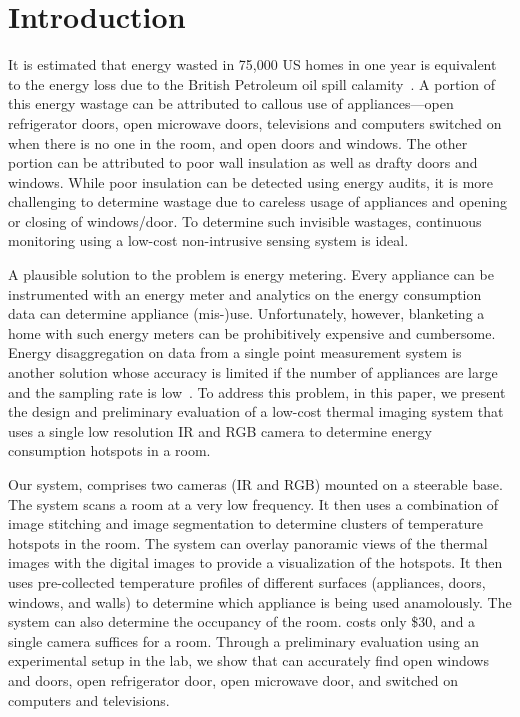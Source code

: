 \section{Introduction}
\label{sec:intro}

It is estimated that energy wasted in 75,000 US homes in one year is equivalent to the energy loss due to the British Petroleum oil
spill calamity~\cite{XX}. A portion of this energy wastage can be attributed to callous use of appliances---open refrigerator doors,
open microwave doors, televisions and computers switched on when there is no one in the room, and open doors and windows. The other
portion can be attributed to poor wall insulation as well as drafty doors and windows. While poor insulation can be detected using
energy audits, it is more challenging to determine wastage due to careless usage of appliances and opening or closing of windows/door.
To determine such invisible wastages, continuous monitoring using a low-cost non-intrusive sensing system is ideal.

A plausible solution to the problem is energy metering. Every appliance can be instrumented with an energy meter and analytics on the
energy consumption data can determine appliance (mis-)use. Unfortunately, however, blanketing a home with such energy meters can be
prohibitively expensive and cumbersome. Energy disaggregation on data from a single point measurement system is another solution 
whose accuracy is limited if the number of appliances are large and the sampling rate is low~\cite{XX}. To address this problem, in
this paper, we present the design and preliminary evaluation of a low-cost thermal imaging system that uses a single low resolution IR
and RGB camera to determine energy consumption hotspots in a room.

Our system, {\IRLeak} comprises two cameras (IR and RGB) mounted on a steerable base. The system scans a room at a very low frequency.
It then uses a combination of image stitching and image segmentation to determine clusters of temperature hotspots in the room. The
system can overlay panoramic views of the thermal images with the digital images to provide a visualization of the hotspots. It then
uses pre-collected temperature profiles of different surfaces (appliances, doors, windows, and walls) to determine which appliance is
being used anamolously. The system can also determine the occupancy of the room. {\IRLeak} costs only \$30, and a single camera
suffices for a room. Through a preliminary evaluation using an experimental setup in the lab, we show that {\IRLeak} can accurately
find open windows and doors, open refrigerator door, open microwave door, and switched on computers and televisions. 

